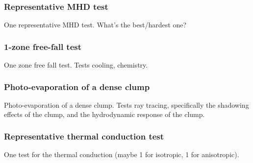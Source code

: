 \subsubsection{Representative MHD test}
\label{sec.tests.mhd}
One representative MHD test.  What's the best/hardest one?

\subsubsection{1-zone free-fall test}
\label{sec.tests.freefall}
One zone free fall test.  Tests cooling, chemistry.

\subsubsection{Photo-evaporation of a dense clump}
\label{sec.tests.raytracing}
Photo-evaporation of a dense clump.  Tests ray tracing, specifically
the shadowing effects of the clump, and the hydrodynamic response of
the clump.





\subsubsection{Representative thermal conduction test}
\label{sec.tests.conduct}
One test for the thermal conduction (maybe 1 for isotropic, 1 for
anisotropic).
